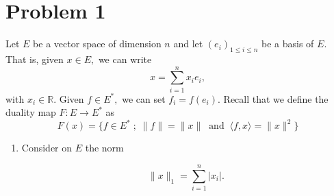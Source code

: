 \documentclass[11pt]{article}
\newcommand{\bbR}{\mathbb{R}}
\begin{document}
	
	
	\psetheader

\section*{Problem 1}
\begin{problem}
Let $E$ be a vector space of dimension $n$ and let $(e_i)_{1\leq i\leq n}$ be a basis of $E.$ That is, given $x\in E,$ we can write 
\[x = \sum_{i=1}^n x_i e_i,\] with $x_i \in \bbR.$ Given $f\in E^\ast,$ we can set $f_i = f(e_i).$ Recall that we define the duality map $F: E \to E^\ast$ as
\[F(x) = \{f\in E^* \; ; \; \|f\| = \|x\| \;\; \text{and} \;\; \langle f, x\rangle = \|x\|^2\}\]
    \begin{enumerate}
    \item Consider on \( E \) the norm
    

\[
    \|x\|_1 = \sum_{i=1}^{n} |x_i|.
    \]



\end{enumerate}
\end{problem}
\end{document}
